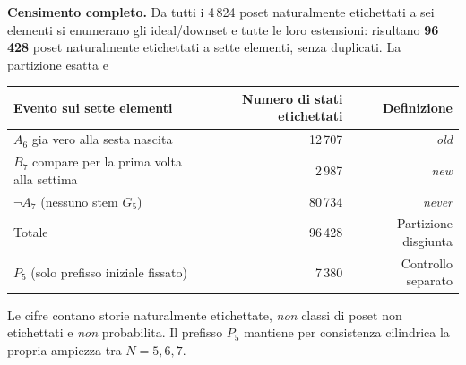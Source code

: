 \documentclass[11pt,a4paper]{article}
\begin{document}
\textbf{Censimento completo.} Da tutti i 4\,824 poset naturalmente etichettati a sei elementi si enumerano gli ideal/downset e tutte le loro estensioni: risultano \textbf{96\,428} poset naturalmente etichettati a sette elementi, senza duplicati. La partizione esatta e
\begin{center}\small
\begin{tabular}{lrr}
\toprule
Evento sui sette elementi & Numero di stati etichettati & Definizione \\\midrule
$A_6$ gia vero alla sesta nascita & 12\,707 & \emph{old}\\
$B_7$ compare per la prima volta alla settima & 2\,987 & \emph{new}\\
$\neg A_7$ (nessuno stem $G_5$) & 80\,734 & \emph{never}\\\midrule
Totale & 96\,428 & Partizione disgiunta\\
$P_5$ (solo prefisso iniziale fissato) & 7\,380 & Controllo separato\\
\bottomrule
\end{tabular}
\end{center}
Le cifre contano storie naturalmente etichettate, \emph{non} classi di poset non etichettati e \emph{non} probabilita. Il prefisso $P_5$ mantiene per consistenza cilindrica la propria ampiezza tra $N=5,6,7$.

\clearpage
\end{document}
